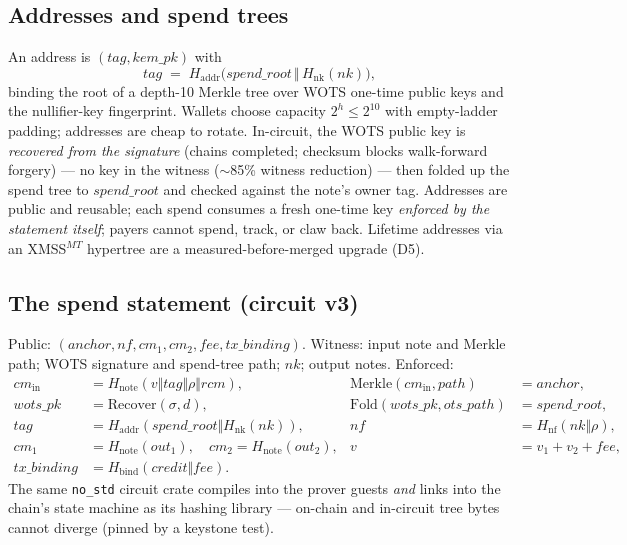 \documentclass[11pt]{article}
\newcommand{\Hh}[1]{H_{\mathrm{#1}}}
\newcommand{\ct}[1]{\texttt{#1}}
\begin{document}
\subsection{Addresses and spend trees}\label{sec:spendtree}
An address is $(\mathit{tag}, \mathit{kem\_pk})$ with
\[ \mathit{tag} \;=\; \Hh{addr}\big(\mathit{spend\_root} \,\Vert\, \Hh{nk}(\mathit{nk})\big), \]
binding the root of a depth-10 Merkle tree over WOTS one-time public keys and the nullifier-key fingerprint. Wallets choose capacity $2^h \le 2^{10}$ with empty-ladder padding; addresses are cheap to rotate. In-circuit, the WOTS public key is \emph{recovered from the signature} (chains completed; checksum blocks walk-forward forgery) --- no key in the witness ($\sim$85\% witness reduction) --- then folded up the spend tree to $\mathit{spend\_root}$ and checked against the note's owner tag. Addresses are public and reusable; each spend consumes a fresh one-time key \emph{enforced by the statement itself}; payers cannot spend, track, or claw back. Lifetime addresses via an XMSS$^{MT}$ hypertree are a measured-before-merged upgrade (D5).

\subsection{The spend statement (circuit v3)}
Public: $(\mathit{anchor}, \mathit{nf}, \mathit{cm}_1, \mathit{cm}_2, \mathit{fee}, \mathit{tx\_binding})$. Witness: input note and Merkle path; WOTS signature and spend-tree path; $\mathit{nk}$; output notes. Enforced:
\begin{align*}
\mathit{cm}_{\mathrm{in}} &= \Hh{note}(v \Vert \mathit{tag} \Vert \rho \Vert \mathit{rcm}), & \mathrm{Merkle}(\mathit{cm}_{\mathrm{in}},\mathit{path}) &= \mathit{anchor},\\
\mathit{wots\_pk} &= \mathrm{Recover}(\sigma, d), & \mathrm{Fold}(\mathit{wots\_pk},\mathit{ots\_path}) &= \mathit{spend\_root},\\
\mathit{tag} &= \Hh{addr}(\mathit{spend\_root} \Vert \Hh{nk}(\mathit{nk})), & \mathit{nf} &= \Hh{nf}(\mathit{nk} \Vert \rho),\\
\mathit{cm}_1 &= \Hh{note}(\mathit{out}_1), \quad \mathit{cm}_2 = \Hh{note}(\mathit{out}_2), & v &= v_1 + v_2 + \mathit{fee},\\
\mathit{tx\_binding} &= \Hh{bind}(\mathit{credit} \Vert \mathit{fee}). &&
\end{align*}
The same \ct{no\_std} circuit crate compiles into the prover guests \emph{and} links into the chain's state machine as its hashing library --- on-chain and in-circuit tree bytes cannot diverge (pinned by a keystone test).
\end{document}
